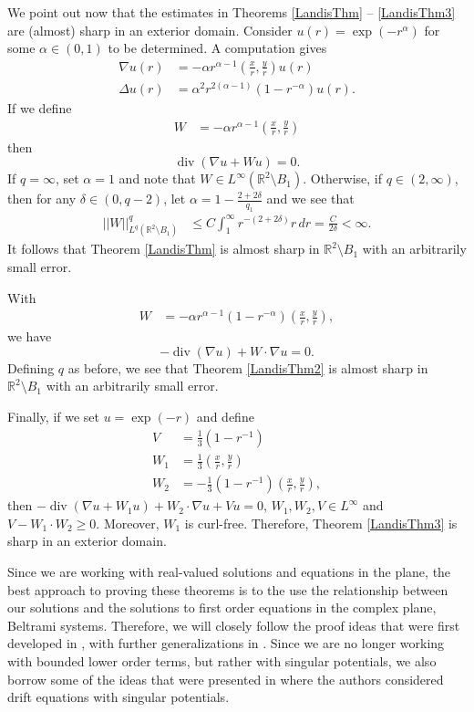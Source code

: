 \documentclass[12pt,reqno]{amsart}
\theoremstyle{plain}
\theoremstyle{definition}
\DeclareMathOperator{\di}{div}
\newcommand{\al}{\alpha}
\newcommand{\de}{\delta}
\newcommand{\iny}{\infty}
\newcommand{\LP}{\Delta}
\newcommand{\gr}{\nabla}
\newcommand{\norm}[1]{\left\vert \left\vert #1\right\vert\right\vert}
\newcommand{\pr}[1]{\left( #1 \right) }
\newcommand{\R}{\ensuremath{\mathbb{R}}}
\begin{document}
We point out now that the estimates in Theorems \ref{LandisThm} -- \ref{LandisThm3} are (almost) sharp in an exterior domain.
Consider $u\pr{r} = \exp\pr{- r^\al}$ for some $\al \in \pr{0, 1}$ to be determined.
A computation gives
\begin{align*}
\gr u\pr{r} &= - \al r^{\al -1} \pr{\frac x r, \frac y r} u\pr{r} \\
\LP u\pr{r} &= \al^2 r^{2\pr{\al - 1}}\pr{1 - r^{-\al}} u\pr{r}.
\end{align*}
If we define
\begin{align*}
W &= - \al r^{\al-1} \pr{\frac x r, \frac y r}
\end{align*}
then
$$\di \pr{\gr u + W u} = 0.$$
If $q = \iny$, set $\al = 1$ and note that $W \in L^\iny\pr{\R^2 \setminus B_1}$.
Otherwise, if $q \in \pr{2, \iny}$, then for any $\de \in \pr{0, q - 2}$, let $\al = 1 - \frac {2 + 2\de} {q_1}$ and we see that
\begin{align*}
\norm{W}^{q}_{L^{q}\pr{\R^2 \setminus B_1}}
&\le C \int_1^\iny r^{-\pr{2 + 2\de}} r \, dr
= \frac C {2\de} 
< \iny.
\end{align*}
It follows that Theorem \ref{LandisThm} is almost sharp in $\R^2 \setminus B_1$ with an arbitrarily small error.

With
\begin{align*}
W &= - \al r^{\al-1} \pr{1 - r^{-\al}} \pr{\frac x r, \frac y r},
\end{align*}
we have
$$- \di \pr{\gr u} + W \cdot \gr u = 0.$$
Defining $q$ as before, we see that Theorem \ref{LandisThm2} is almost sharp in $\R^2 \setminus B_1$ with an arbitrarily small error.

Finally, if we set $u = \exp\pr{-r}$ and define
\begin{align*}
V &= \frac 1 3 \pr{1 - r^{-1}} \\
W_1 &= \frac 1 3 \pr{\frac x r, \frac y r}  \\
W_2 &= - \frac 1 3 \pr{1 - r^{-1}} \pr{\frac x r, \frac y r},
\end{align*}
then $-\di\pr{\gr u + W_1 u} + W_2 \cdot \gr u + V u = 0$, $W_1, W_2, V \in L^\iny$ and $V - W_1 \cdot W_2 \ge 0$.  
Moreover, $W_1$ is curl-free.
Therefore, Theorem \ref{LandisThm3} is sharp in an exterior domain.

Since we are working with real-valued solutions and equations in the plane, the best approach to proving these theorems is to the use the relationship between our solutions and the solutions to first order equations in the complex plane, Beltrami systems.
Therefore, we will closely follow the proof ideas that were first developed in \cite{KSW15}, with further generalizations in \cite{DKW17}.
Since we are no longer working with bounded lower order terms, but rather with singular potentials, we also borrow some of the ideas that were presented in \cite{KW15} where the authors considered drift equations with singular potentials.
\end{document}
